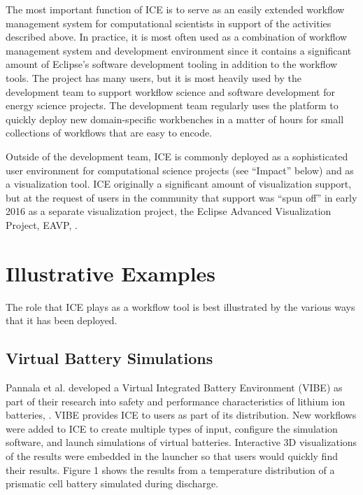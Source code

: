 The most important function of ICE is to serve as an easily extended
workflow management system for computational scientists in support of
the activities described above. In practice, it is most often used as a
combination of workflow management system and development environment
since it contains a significant amount of Eclipse's software development
tooling in addition to the workflow tools. The project has many users,
but it is most heavily used by the development team to support workflow
science and software development for energy science projects. The
development team regularly uses the platform to quickly deploy new
domain-specific workbenches in a matter of hours for small collections
of workflows that are easy to encode.

Outside of the development team, ICE is commonly deployed as a
sophisticated user environment for computational science projects (see
``Impact'' below) and as a visualization tool. ICE originally a
significant amount of visualization support, but at the request of users
in the community that support was ``spun off'' in early 2016 as a
separate visualization project, the Eclipse Advanced Visualization
Project, EAVP, \cite{billings_eclipse_2015}.

\section{Illustrative Examples}\label{illustrative-examples}

The role that ICE plays as a workflow tool is best illustrated by the
various ways that it has been deployed.

\subsection{Virtual Battery
Simulations}\label{virtual-battery-simulations}

Pannala et al. developed a Virtual Integrated Battery Environment (VIBE)
as part of their research into safety and performance characteristics of
lithium ion batteries, \cite{pannala_multiscale_2015}. VIBE provides ICE to
users as part of its distribution. New workflows were added to ICE to create
multiple types of input, configure the simulation software, and launch
simulations of virtual batteries. Interactive 3D visualizations of the
results were embedded in the launcher so that users would quickly find
their results. Figure 1 shows the results from a temperature
distribution of a prismatic cell battery simulated during discharge.


